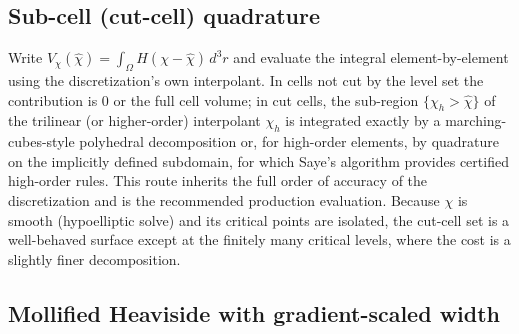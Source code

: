 \documentclass[english]{article}
\begin{document}
\subsection{Sub-cell (cut-cell) quadrature}
\label{sec:cutcell}

Write $V_\chi(\hat\chi)=\int_\Omega H(\chi-\hat\chi)\,d^3r$ and evaluate the integral
element-by-element using the discretization's own interpolant. In cells not cut by the level set
the contribution is $0$ or the full cell volume; in cut cells, the sub-region
$\{\chi_h>\hat\chi\}$ of the trilinear (or higher-order) interpolant $\chi_h$ is integrated
exactly by a marching-cubes-style polyhedral decomposition \cite{lorensen1987} or, for high-order
elements, by quadrature on the implicitly defined subdomain, for which Saye's algorithm
\cite{saye2015} provides certified high-order rules. This route inherits the full order of
accuracy of the discretization and is the recommended production evaluation. Because $\chi$ is
smooth (hypoelliptic solve) and its critical points are isolated, the cut-cell set is a
well-behaved surface except at the finitely many critical levels, where the cost is a slightly
finer decomposition.

\subsection{Mollified Heaviside with gradient-scaled width}
\label{sec:mollified}
\end{document}
